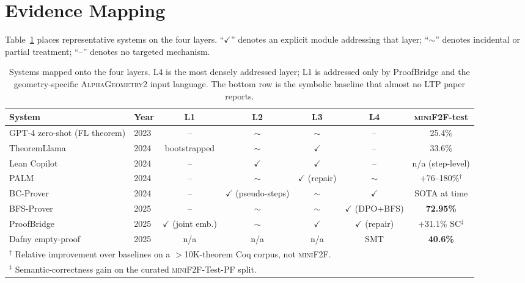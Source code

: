 \documentclass[11pt,letterpaper]{article}
\begin{document}
\section{Evidence Mapping}
\label{sec:mapping}

Table~\ref{tab:systems} places representative systems on the four
layers. ``$\checkmark$'' denotes an explicit module addressing that
layer; ``$\sim$'' denotes incidental or partial treatment; ``--''
denotes no targeted mechanism.

\begin{table}[t]
\centering
\small
\begin{tabular}{llccccc}
\toprule
System & Year & L1 & L2 & L3 & L4 & \textsc{miniF2F}-test \\
\midrule
GPT-4 zero-shot (FL theorem) & 2023 & -- & $\sim$ & $\sim$ & -- & 25.4\% \\
TheoremLlama \cite{wang2024theoremllama} & 2024 & bootstrapped & $\sim$ & $\checkmark$ & -- & 33.6\% \\
Lean Copilot \cite{song2024leancopilot} & 2024 & -- & $\checkmark$ & $\checkmark$ & -- & n/a (step-level) \\
PALM \cite{lu2024palm} & 2024 & -- & $\sim$ & $\checkmark$ (repair) & $\sim$ & $+$76--180\%$^\dagger$ \\
BC-Prover \cite{he2024bcprover} & 2024 & -- & $\checkmark$ (pseudo-steps) & $\sim$ & $\checkmark$ & SOTA at time \\
BFS-Prover \cite{xin2025bfsprover} & 2025 & -- & $\sim$ & $\sim$ & $\checkmark$ (DPO+BFS) & \textbf{72.95\%} \\
ProofBridge \cite{jana2025proofbridge} & 2025 & $\checkmark$ (joint emb.) & $\sim$ & $\checkmark$ & $\checkmark$ (repair) & +31.1\% SC$^\ddagger$ \\
\midrule
Dafny empty-proof \cite{baksys2025mini2f2dafny} & 2025 & n/a & n/a & n/a & SMT & \textbf{40.6\%} \\
\bottomrule
\multicolumn{7}{l}{\footnotesize $^\dagger$ Relative improvement over baselines on a $>$10K-theorem Coq corpus, not \textsc{miniF2F}.}\\
\multicolumn{7}{l}{\footnotesize $^\ddagger$ Semantic-correctness gain on the curated \textsc{miniF2F}-Test-PF split.}
\end{tabular}
\caption{Systems mapped onto the four layers. L4 is the most densely
addressed layer; L1 is addressed only by ProofBridge and the
geometry-specific \textsc{AlphaGeometry2} input language. The bottom
row is the symbolic baseline that almost no LTP paper reports.}
\label{tab:systems}
\end{table}
\end{document}
